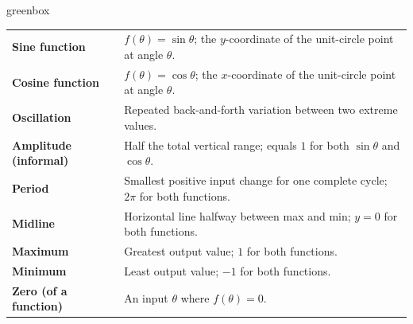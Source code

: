 \documentclass[10pt]{article}
\begin{document}
\begin{skillbox}{greenbox}
\renewcommand{\arraystretch}{1.45}
\begin{tabularx}{\linewidth}{@{} l X @{}}
    \textbf{Sine function}        & $f(\theta)=\sin\theta$; the $y$-coordinate of the
                                    unit-circle point at angle $\theta$. \\
    \textbf{Cosine function}      & $f(\theta)=\cos\theta$; the $x$-coordinate of the
                                    unit-circle point at angle $\theta$. \\
    \textbf{Oscillation}          & Repeated back-and-forth variation between two extreme
                                    values. \\
    \textbf{Amplitude (informal)} & Half the total vertical range; equals $1$ for both
                                    $\sin\theta$ and $\cos\theta$. \\
    \textbf{Period}               & Smallest positive input change for one complete cycle;
                                    $2\pi$ for both functions. \\
    \textbf{Midline}              & Horizontal line halfway between max and min; $y=0$ for
                                    both functions. \\
    \textbf{Maximum}              & Greatest output value; $1$ for both functions. \\
    \textbf{Minimum}              & Least output value; $-1$ for both functions. \\
    \textbf{Zero (of a function)} & An input $\theta$ where $f(\theta)=0$. \\
\end{tabularx}
\end{skillbox}
\end{document}
